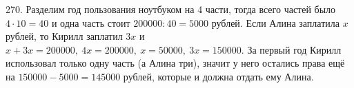 270. Разделим год пользования ноутбуком на 4 части, тогда всего частей было $4\cdot10=40$ и одна часть стоит $200000:40=5000$ рублей. Если Алина заплатила $x$ рублей, то Кирилл заплатил $3x$ и $x+3x=200000,\ 4x=200000,\ x=50000,\ 3x=150000.$ За первый год Кирилл использовал только одну часть (а Алина три), значит у него остались права ещё на $150000-5000=145000$ рублей, которые и должна отдать ему Алина.\\
